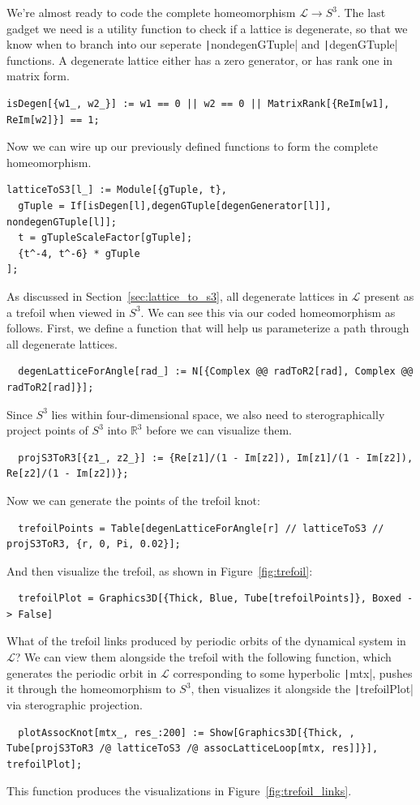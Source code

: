 \documentclass[12pt,twoside]{reedthesis}
\theoremstyle{definition}
\newcommand{\R}{\mathbb{R}}
\newcommand{\LS}{\mathcal{L}}
\begin{document}
We're almost ready to code the complete homeomorphism $\LS \to S^3$.
The last gadget we need is a utility function to check if a lattice is degenerate, so that we know when to branch into our seperate \texttt|nondegenGTuple| and \texttt|degenGTuple| functions.
A degenerate lattice either has a zero generator, or has rank one in matrix form.
\begin{verbatim}
isDegen[{w1_, w2_}] := w1 == 0 || w2 == 0 || MatrixRank[{ReIm[w1], ReIm[w2]}] == 1;
\end{verbatim}
Now we can wire up our previously defined functions to form the complete homeomorphism.
\begin{verbatim}
latticeToS3[l_] := Module[{gTuple, t},
  gTuple = If[isDegen[l],degenGTuple[degenGenerator[l]], nondegenGTuple[l]]; 
  t = gTupleScaleFactor[gTuple];
  {t^-4, t^-6} * gTuple
];
\end{verbatim}
As discussed in Section~\ref{sec:lattice_to_s3}, all degenerate lattices in $\LS$ present as a trefoil when viewed in $S^3$.
We can see this via our coded homeomorphism as follows.
First, we define a function that will help us parameterize a path through all degenerate lattices.
\begin{verbatim}
  degenLatticeForAngle[rad_] := N[{Complex @@ radToR2[rad], Complex @@ radToR2[rad]}];
\end{verbatim}
Since $S^3$ lies within four-dimensional space, we also need to sterographically project points of $S^3$ into $\R^3$ before we can visualize them.
\begin{verbatim}
  projS3ToR3[{z1_, z2_}] := {Re[z1]/(1 - Im[z2]), Im[z1]/(1 - Im[z2]), Re[z2]/(1 - Im[z2])};
\end{verbatim}
Now we can generate the points of the trefoil knot:
\begin{verbatim}
  trefoilPoints = Table[degenLatticeForAngle[r] // latticeToS3 // projS3ToR3, {r, 0, Pi, 0.02}];
\end{verbatim}
And then visualize the trefoil, as shown in Figure~\ref{fig:trefoil}:
\begin{verbatim}
  trefoilPlot = Graphics3D[{Thick, Blue, Tube[trefoilPoints]}, Boxed -> False]
\end{verbatim}

What of the trefoil links produced by periodic orbits of the dynamical system in $\LS$?
We can view them alongside the trefoil with the following function, which generates the periodic orbit in $\LS$ corresponding to some hyperbolic \texttt|mtx|, pushes it through the homeomorphism to $S^3$, then visualizes it alongside the \texttt|trefoilPlot| via sterographic projection.
\begin{verbatim}
  plotAssocKnot[mtx_, res_:200] := Show[Graphics3D[{Thick, , Tube[projS3ToR3 /@ latticeToS3 /@ assocLatticeLoop[mtx, res]]}], trefoilPlot];
\end{verbatim}
This function produces the visualizations in Figure~\ref{fig:trefoil_links}.
\end{document}
